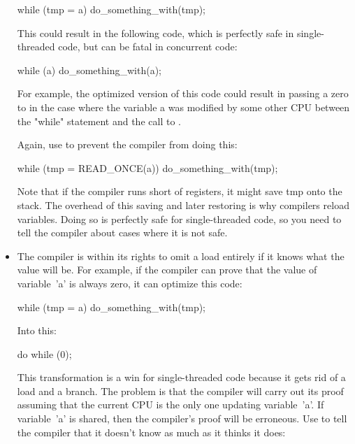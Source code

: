\begin{itemize}
\begin{VerbatimU}
	while (tmp = a)
		do_something_with(tmp);
\end{VerbatimU}

     This could result in the following code, which is perfectly safe in
     single-threaded code, but can be fatal in concurrent code:

\begin{VerbatimU}
	while (a)
		do_something_with(a);
\end{VerbatimU}

     For example, the optimized version of this code could result in
     passing a zero to  in the case where the variable
     a was modified by some other CPU between the "while" statement and
     the call to .

     Again, use  to prevent the compiler from doing this:

\begin{VerbatimU}
	while (tmp = READ_ONCE(a))
		do_something_with(tmp);
\end{VerbatimU}

     Note that if the compiler runs short of registers, it might save
     tmp onto the stack.
     The overhead of this saving and later restoring is why compilers
     reload variables.
     Doing so is perfectly safe for single-threaded code, so you need
     to tell the compiler about cases where it is not safe.

 \item
     The compiler is within its rights to omit a load entirely if it knows
     what the value will be.
     For example, if the compiler can prove that the value of variable~'a'
     is always zero, it can optimize this code:

\begin{VerbatimU}
	while (tmp = a)
		do_something_with(tmp);
\end{VerbatimU}

     Into this:

\begin{VerbatimU}
	do { } while (0);
\end{VerbatimU}

     This transformation is a win for single-threaded code because it
     gets rid of a load and a branch.
     The problem is that the compiler will carry out its proof assuming
     that the current CPU is the only one updating variable~'a'.
     If variable~'a' is shared, then the compiler's proof will be erroneous.
     Use  to tell the compiler that it doesn't know as
     much as it thinks it does:


\end{itemize}
